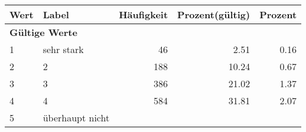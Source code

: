     \begin{longtable}{lXrrr}
     \toprule
     \textbf{Wert} & \textbf{Label} & \textbf{Häufigkeit} & \textbf{Prozent(gültig)} & \textbf{Prozent} \\
     \endhead
     \midrule
     \multicolumn{5}{l}{\textbf{Gültige Werte}}\\

     1 &
     \multicolumn{1}{X}{ sehr stark   } &


       \num{46} &
       \num[round-mode=places,round-precision=2]{2.51} &
         \num[round-mode=places,round-precision=2]{0.16} \\

     2 &
     \multicolumn{1}{X}{ 2   } &


       \num{188} &
       \num[round-mode=places,round-precision=2]{10.24} &
         \num[round-mode=places,round-precision=2]{0.67} \\

     3 &
     \multicolumn{1}{X}{ 3   } &


       \num{386} &
       \num[round-mode=places,round-precision=2]{21.02} &
         \num[round-mode=places,round-precision=2]{1.37} \\

     4 &
     \multicolumn{1}{X}{ 4   } &


       \num{584} &
       \num[round-mode=places,round-precision=2]{31.81} &
         \num[round-mode=places,round-precision=2]{2.07} \\

     5 &
     \multicolumn{1}{X}{ überhaupt nicht   } &



\end{longtable}
